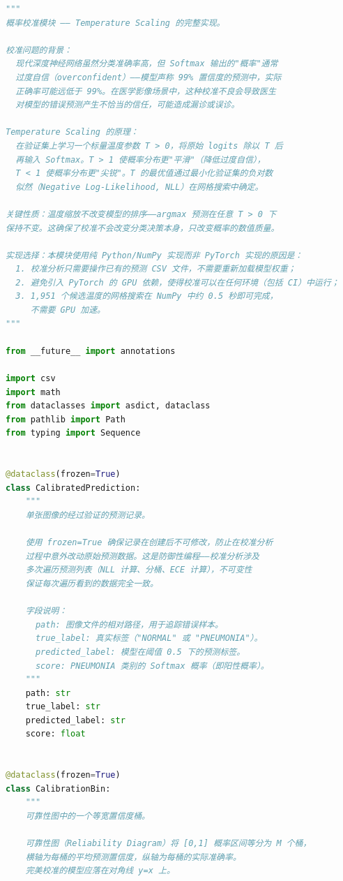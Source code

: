 \documentclass[12pt,a4paper,UTF8,openany]{ctexbook}
\begin{document}
\begin{lstlisting}[language=Python, caption={概率校准模块（calibration.py）}, label={lst:calibration}]
"""
概率校准模块 —— Temperature Scaling 的完整实现。

校准问题的背景：
  现代深度神经网络虽然分类准确率高，但 Softmax 输出的"概率"通常
  过度自信（overconfident）——模型声称 99% 置信度的预测中，实际
  正确率可能远低于 99%。在医学影像场景中，这种校准不良会导致医生
  对模型的错误预测产生不恰当的信任，可能造成漏诊或误诊。

Temperature Scaling 的原理：
  在验证集上学习一个标量温度参数 T > 0，将原始 logits 除以 T 后
  再输入 Softmax。T > 1 使概率分布更"平滑"（降低过度自信），
  T < 1 使概率分布更"尖锐"。T 的最优值通过最小化验证集的负对数
  似然（Negative Log-Likelihood, NLL）在网格搜索中确定。

关键性质：温度缩放不改变模型的排序——argmax 预测在任意 T > 0 下
保持不变。这确保了校准不会改变分类决策本身，只改变概率的数值质量。

实现选择：本模块使用纯 Python/NumPy 实现而非 PyTorch 实现的原因是：
  1. 校准分析只需要操作已有的预测 CSV 文件，不需要重新加载模型权重；
  2. 避免引入 PyTorch 的 GPU 依赖，使得校准可以在任何环境（包括 CI）中运行；
  3. 1,951 个候选温度的网格搜索在 NumPy 中约 0.5 秒即可完成，
     不需要 GPU 加速。
"""

from __future__ import annotations

import csv
import math
from dataclasses import asdict, dataclass
from pathlib import Path
from typing import Sequence


@dataclass(frozen=True)
class CalibratedPrediction:
    """
    单张图像的经过验证的预测记录。

    使用 frozen=True 确保记录在创建后不可修改，防止在校准分析
    过程中意外改动原始预测数据。这是防御性编程——校准分析涉及
    多次遍历预测列表（NLL 计算、分桶、ECE 计算），不可变性
    保证每次遍历看到的数据完全一致。

    字段说明：
      path: 图像文件的相对路径，用于追踪错误样本。
      true_label: 真实标签（"NORMAL" 或 "PNEUMONIA"）。
      predicted_label: 模型在阈值 0.5 下的预测标签。
      score: PNEUMONIA 类别的 Softmax 概率（即阳性概率）。
    """
    path: str
    true_label: str
    predicted_label: str
    score: float


@dataclass(frozen=True)
class CalibrationBin:
    """
    可靠性图中的一个等宽置信度桶。

    可靠性图（Reliability Diagram）将 [0,1] 概率区间等分为 M 个桶，
    横轴为每桶的平均预测置信度，纵轴为每桶的实际准确率。
    完美校准的模型应落在对角线 y=x 上。


\end{lstlisting}
\end{document}
